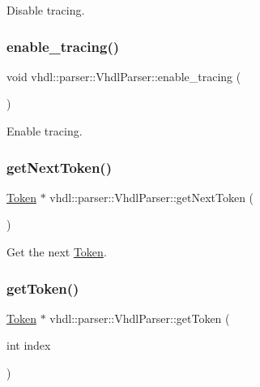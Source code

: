Disable tracing. \mbox{\label{classvhdl_1_1parser_1_1_vhdl_parser_a7877fd75cceac83e5ada4058fc0e1f70}} 
\subsubsection{\texorpdfstring{enable\_tracing()}{enable\_tracing()}}
{\footnotesize\ttfamily void vhdl\+::parser\+::\+Vhdl\+Parser\+::enable\+\_\+tracing (\begin{DoxyParamCaption}{ }\end{DoxyParamCaption})}

Enable tracing. \mbox{\label{classvhdl_1_1parser_1_1_vhdl_parser_a270d52dd71f49d36fff719b9a90cb486}} 
\subsubsection{\texorpdfstring{getNextToken()}{getNextToken()}}
{\footnotesize\ttfamily \mbox{\hyperlink{classvhdl_1_1parser_1_1_token}{Token}} $\ast$ vhdl\+::parser\+::\+Vhdl\+Parser\+::get\+Next\+Token (\begin{DoxyParamCaption}{ }\end{DoxyParamCaption})}

Get the next \mbox{\hyperlink{classvhdl_1_1parser_1_1_token}{Token}}. \mbox{\label{classvhdl_1_1parser_1_1_vhdl_parser_a24b75d394d771199e3472e85d4c7ea9d}} 
\subsubsection{\texorpdfstring{getToken()}{getToken()}}
{\footnotesize\ttfamily \mbox{\hyperlink{classvhdl_1_1parser_1_1_token}{Token}} $\ast$ vhdl\+::parser\+::\+Vhdl\+Parser\+::get\+Token (\begin{DoxyParamCaption}\item[{int}]{index }\end{DoxyParamCaption})}

